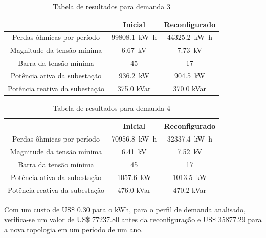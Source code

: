 \begin{table}[H]
    \centering
    \caption{Tabela de resultados para demanda 3}
    \begin{tabular}{|c|c|c|}
    \hline
                                   & Inicial              & Reconfigurado               \\\hline
    Perdas ôhmicas por período       & \SI{99808.1}{\kilo\watt\hour}      & \SI{44325.2}{\kilo\watt\hour}  \\\hline
    Magnitude da tensão mínima     & \SI{6.67}{\kilo\volt}    & \SI{7.73}{\kilo\volt}   \\\hline
    Barra da tensão mínima         & 45                       & 17                      \\\hline
    Potência ativa da subestação   & \SI{936.2}{\kilo\watt} & \SI{904.5}{\kilo\watt}\\\hline
    Potência reativa da subestação & 375.0 kVar              & 370.0 kVar      \\\hline
    \end{tabular}
    \label{tab:45rand3}
\end{table}

\begin{table}[H]
    \centering
    \caption{Tabela de resultados para demanda 4}
    \begin{tabular}{|c|c|c|}
    \hline
                                   & Inicial              & Reconfigurado               \\\hline
    Perdas ôhmicas por período       & \SI{70956.8}{\kilo\watt\hour}      & \SI{32337.4}{\kilo\watt\hour}  \\\hline
    Magnitude da tensão mínima     & \SI{6.41}{\kilo\volt}    & \SI{7.52}{\kilo\volt}   \\\hline
    Barra da tensão mínima         & 45                       & 17                      \\\hline
    Potência ativa da subestação   & \SI{1057.6}{\kilo\watt} & \SI{1013.5}{\kilo\watt}\\\hline
    Potência reativa da subestação & 476.0 kVar              & 470.2 kVar      \\\hline
    \end{tabular}
    \label{tab:45rand4}
\end{table}

Com um custo de US\$ 0.30 para o kWh, para o perfil de demanda analisado, verifica-se um valor de US\$ 77237.80 antes da reconfiguração e US\$ 35877.29 para a nova topologia em um período de um ano.